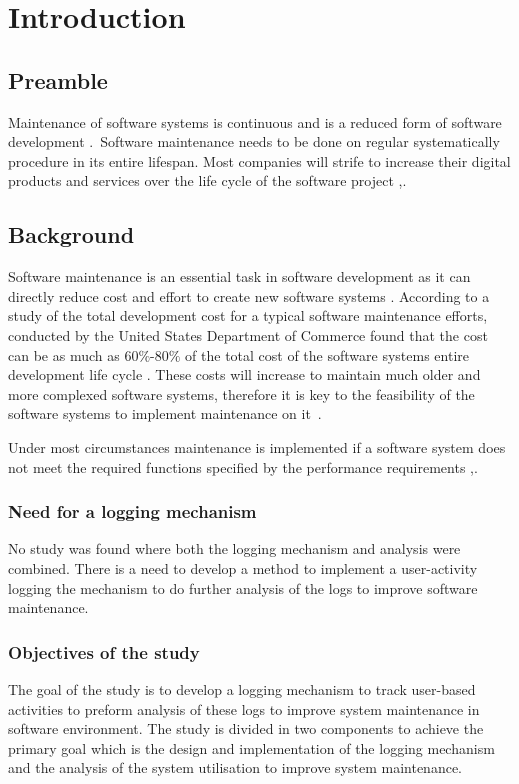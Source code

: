 \chapter{Introduction}
\label{chap:1}

\section{Preamble}
Maintenance of software systems is continuous and is a reduced form of software
development \cite{Sneed2004}.~Software maintenance needs to be done on regular
systematically procedure in its entire lifespan. Most companies will strife to increase their digital products and services over the life cycle of the software project \cite{Niu2018},\cite{Galster2019}.

\section{Background}
Software maintenance is an essential task in software development as it can directly reduce cost and effort to create new software systems \cite{FrancisThamburaj2017}. According to a study of the total development cost for a typical software maintenance efforts, conducted by the United States Department of Commerce found that the cost can be as much as $60\%$-$80\%$ of the total cost of the software systems entire development life cycle \cite{Ogheneovo2014}. These costs will increase to maintain much older and more complexed software systems, therefore it is key to the feasibility of the software systems to implement maintenance on it~\cite{Alenezi2016}.\par Under most circumstances maintenance is implemented if a software system does not meet the required functions specified by the performance requirements \cite{Ogheneovo2014},\cite{Sneed2004}.

\newpage

\subsection{Need for a logging mechanism}
No study was found where both the logging mechanism and analysis were combined.
There is a need to develop a method to implement a user-activity logging
the mechanism to do further analysis of the logs to improve software
maintenance.

\subsection{Objectives of the study}
The goal of the study is to develop a logging mechanism to track user-based
activities to preform analysis of these logs to improve system maintenance in
software environment. The study is divided in two components to achieve the
primary goal which is the design and implementation of the logging mechanism
and the analysis of the system utilisation to improve system maintenance.

